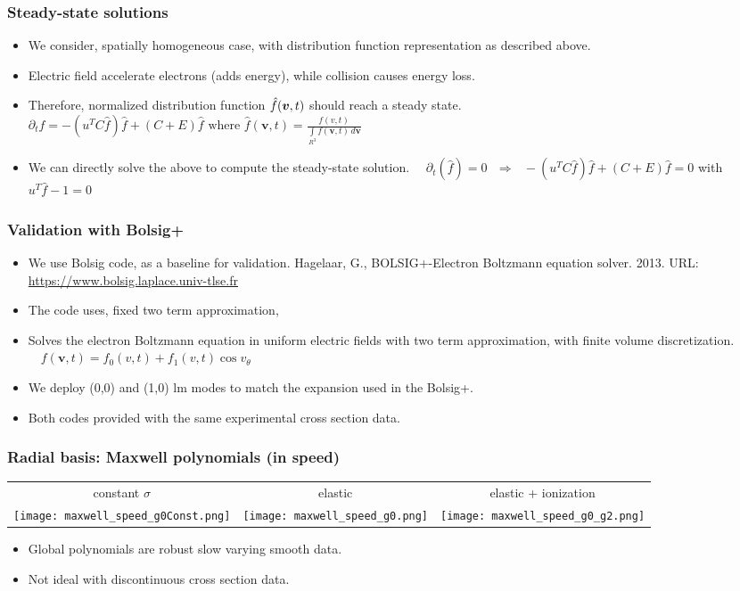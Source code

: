 \documentclass[mathserif, aspectratio=169]{beamer}
\newcommand{\vect}[1]{\boldsymbol{#1}}
\newcommand{\of}[1]{\mleft( #1 \mright)}
\newcommand{\myint}{\int\limits}
\newcommand{\diff}[1]{\, d#1}
\begin{document}
\begin{frame}
	\frametitle{Steady-state solutions}
	\begin{itemize}
		\item We consider, spatially homogeneous case, with distribution function representation as described above.  
		\item Electric field accelerate electrons (adds energy), while collision causes energy loss.
		\item Therefore, normalized distribution function $\hat{f}\of{\vect{v},t}$ should reach a steady state.  
		$
		\displaystyle
		\partial_t \hat{f} = -(u^T C \hat{f}) \hat{f} + (C+E)\hat{f} \text{ where } \hat{f}(\vect{v},t) = \frac{f(v,t)}{\myint_{R^3} f(\vect{v},t) \diff{\vect{v}}}
		$
		\item We can directly solve the above to compute the steady-state solution.
		$
		\displaystyle
		\quad
		\partial_t (\hat{f}) = 0 \ \ \  \Rightarrow \ \ \ -(u^T C \hat{f}) \hat{f} + (C+E)\hat{f} =0
		$ with $u^T \hat{f}-1=0$
	\end{itemize}
\end{frame}

\begin{frame}
	\frametitle{Validation with Bolsig+}
	\begin{itemize}
		\item We use Bolsig code, as a baseline for validation. 
		Hagelaar, G., BOLSIG+-Electron Boltzmann equation solver. 2013. URL: \url{https://www.bolsig.laplace.univ-tlse.fr}
		\item The code uses, fixed two term approximation, 
		\item Solves the electron Boltzmann equation in uniform electric fields with two term approximation, with finite volume discretization. \\
		$
		\displaystyle
		\quad
		f(\vect{v},t) = f_0(v, t) + f_1(v,t)\cos v_\theta
		$ 
		\item We deploy (0,0) and (1,0) lm modes to match the expansion used in the Bolsig+.
		\item Both codes provided with the same experimental cross section data. 
	\end{itemize}
\end{frame}

\begin{frame}
	\frametitle{Radial basis: Maxwell polynomials (in speed)}
	\centering
	\begin{tabular}{ccc}
	constant $\sigma$ & elastic & elastic + ionization \\
	\texttt{[image: maxwell\_speed\_g0Const.png]} & 
	\texttt{[image: maxwell\_speed\_g0.png]} & 
	\texttt{[image: maxwell\_speed\_g0\_g2.png]}
	\end{tabular}
	\begin{itemize}
		\item Global polynomials are robust slow varying smooth data. 
		\item Not ideal with discontinuous cross section data. 
	\end{itemize}
\end{frame}
\end{document}
